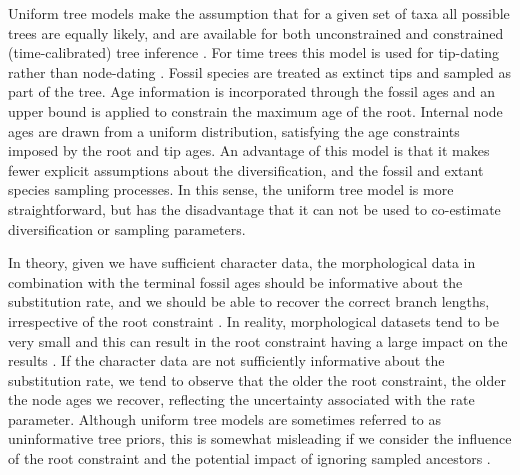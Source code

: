Uniform tree models make the assumption that for a given set of taxa all possible trees are equally likely, and are available for both unconstrained and constrained (time-calibrated) tree inference \citep{Huelsenbeck2001a,Ronquist2012a}.
For time trees this model is used for tip-dating rather than node-dating \citep{Ronquist2012a}.
Fossil species are treated as extinct tips and sampled as part of the tree.
Age information is incorporated through the fossil ages and an upper bound is applied to constrain the maximum age of the root.
Internal node ages are drawn from a uniform distribution, satisfying the age constraints imposed by the root and tip ages.
An advantage of this model is that it makes fewer explicit assumptions about the diversification, and the fossil and extant species sampling processes. 
In this sense, the  uniform tree model is more straightforward, but has the disadvantage that it can not be used to co-estimate diversification or sampling parameters.

In theory, given we have sufficient character data, the morphological data in combination with the terminal fossil ages should be informative about the substitution rate, and we should be able to recover the correct branch lengths, irrespective of the root constraint \citep{Ronquist2012a,Klopfstein2019}.
In reality, morphological datasets tend to be very small and this can result in the root constraint having a large impact on the results \citep{matzke2016}.
If the character data are not sufficiently informative about the substitution rate, we tend to observe that the older the root constraint, the older the node ages we recover, reflecting the uncertainty associated with the rate parameter.
Although uniform tree models are sometimes referred to as uninformative tree priors, this is somewhat misleading if we consider the influence of the root constraint and the potential impact of ignoring sampled ancestors \citep{Gavryushkina2014}.

